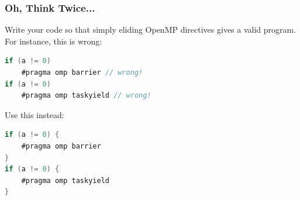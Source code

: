 \begin{frame}[fragile]
\frametitle{Oh, Think Twice...}

 Write your code so that simply eliding OpenMP directives gives a valid program. For instance, this is wrong:
  \begin{lstlisting}[language=C,morekeywords={foreach,pragma,omp,parallel,single,nowait,task,untied,barrier,taskyield}]
if (a != 0)
    #pragma omp barrier // wrong!
if (a != 0)
    #pragma omp taskyield // wrong!
  \end{lstlisting}

  Use this instead:
  \begin{lstlisting}[language=C,morekeywords={foreach,pragma,omp,parallel,single,nowait,task,untied,barrier,taskyield}]
if (a != 0) {
    #pragma omp barrier
}
if (a != 0) {
    #pragma omp taskyield
}
  \end{lstlisting}


\end{frame}





